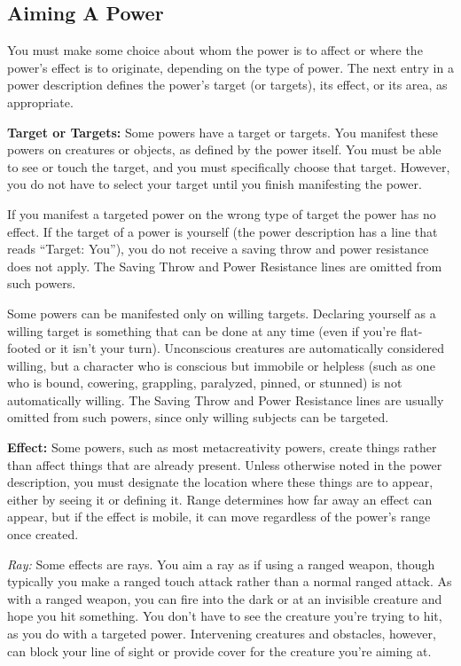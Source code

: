 \subsection{Aiming A Power}
You must make some choice about whom the power is to affect or where the power's effect is to originate, depending on the type of power. The next entry in a power description defines the power's target (or targets), its effect, or its area, as appropriate.

\textbf{Target or Targets:} Some powers have a target or targets. You manifest these powers on creatures or objects, as defined by the power itself. You must be able to see or touch the target, and you must specifically choose that target. However, you do not have to select your target until you finish manifesting the power.

If you manifest a targeted power on the wrong type of target the power has no effect. If the target of a power is yourself (the power description has a line that reads ``Target: You''), you do not receive a saving throw and power resistance does not apply. The Saving Throw and Power Resistance lines are omitted from such powers.

Some powers can be manifested only on willing targets. Declaring yourself as a willing target is something that can be done at any time (even if you're flat-footed or it isn't your turn). Unconscious creatures are automatically considered willing, but a character who is conscious but immobile or helpless (such as one who is bound, cowering, grappling, paralyzed, pinned, or stunned) is not automatically willing. The Saving Throw and Power Resistance lines are usually omitted from such powers, since only willing subjects can be targeted.

\textbf{Effect:} Some powers, such as most metacreativity powers, create things rather than affect things that are already present. Unless otherwise noted in the power description, you must designate the location where these things are to appear, either by seeing it or defining it. Range determines how far away an effect can appear, but if the effect is mobile, it can move regardless of the power's range once created.

\textit{Ray:} Some effects are rays. You aim a ray as if using a ranged weapon, though typically you make a ranged touch attack rather than a normal ranged attack. As with a ranged weapon, you can fire into the dark or at an invisible creature and hope you hit something. You don't have to see the creature you're trying to hit, as you do with a targeted power. Intervening creatures and obstacles, however, can block your line of sight or provide cover for the creature you're aiming at.

